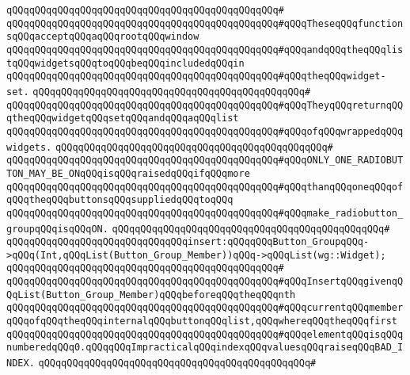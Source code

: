\verb|qQQqqQQqqQQqqQQqqQQqqQQqqQQqqQQqqQQqqQQqqQQqqQQq#|\newline
\verb|qQQqqQQqqQQqqQQqqQQqqQQqqQQqqQQqqQQqqQQqqQQqqQQq#qQQqTheseqQQqfunctionsqQQqacceptqQQqaqQQqrootqQQqwindow|\newline
\verb|qQQqqQQqqQQqqQQqqQQqqQQqqQQqqQQqqQQqqQQqqQQqqQQq#qQQqandqQQqtheqQQqlistqQQqwidgetsqQQqtoqQQqbeqQQqincludedqQQqin|\newline
\verb|qQQqqQQqqQQqqQQqqQQqqQQqqQQqqQQqqQQqqQQqqQQqqQQq#qQQqtheqQQqwidget-set.|\newline
\verb|qQQqqQQqqQQqqQQqqQQqqQQqqQQqqQQqqQQqqQQqqQQqqQQq#|\newline
\verb|qQQqqQQqqQQqqQQqqQQqqQQqqQQqqQQqqQQqqQQqqQQqqQQq#qQQqTheyqQQqreturnqQQqtheqQQqwidgetqQQqsetqQQqandqQQqaqQQqlist|\newline
\verb|qQQqqQQqqQQqqQQqqQQqqQQqqQQqqQQqqQQqqQQqqQQqqQQq#qQQqofqQQqwrappedqQQqwidgets.|\newline
\verb|qQQqqQQqqQQqqQQqqQQqqQQqqQQqqQQqqQQqqQQqqQQqqQQq#|\newline
\verb|qQQqqQQqqQQqqQQqqQQqqQQqqQQqqQQqqQQqqQQqqQQqqQQq#qQQqONLY_ONE_RADIOBUTTON_MAY_BE_ONqQQqisqQQqraisedqQQqifqQQqmore|\newline
\verb|qQQqqQQqqQQqqQQqqQQqqQQqqQQqqQQqqQQqqQQqqQQqqQQq#qQQqthanqQQqoneqQQqofqQQqtheqQQqbuttonsqQQqsuppliedqQQqtoqQQq|\newline
\verb|qQQqqQQqqQQqqQQqqQQqqQQqqQQqqQQqqQQqqQQqqQQqqQQq#qQQqmake_radiobutton_groupqQQqisqQQqON.|\newline
\verb|qQQqqQQqqQQqqQQqqQQqqQQqqQQqqQQqqQQqqQQqqQQqqQQq#|\newline
\newline
\verb|qQQqqQQqqQQqqQQqqQQqqQQqqQQqqQQqinsert:qQQqqQQqButton_GroupqQQq->qQQq(Int,qQQqList(Button_Group_Member))qQQq->qQQqList(wg::Widget);|\newline
\verb|qQQqqQQqqQQqqQQqqQQqqQQqqQQqqQQqqQQqqQQqqQQqqQQq#|\newline
\verb|qQQqqQQqqQQqqQQqqQQqqQQqqQQqqQQqqQQqqQQqqQQqqQQq#qQQqInsertqQQqgivenqQQqList(Button_Group_Member)qQQqbeforeqQQqtheqQQqnth|\newline
\verb|qQQqqQQqqQQqqQQqqQQqqQQqqQQqqQQqqQQqqQQqqQQqqQQq#qQQqcurrentqQQqmemberqQQqofqQQqtheqQQqinternalqQQqbuttonqQQqlist,qQQqwhereqQQqtheqQQqfirst|\newline
\verb|qQQqqQQqqQQqqQQqqQQqqQQqqQQqqQQqqQQqqQQqqQQqqQQq#qQQqelementqQQqisqQQqnumberedqQQq0.qQQqqQQqImpracticalqQQqindexqQQqvaluesqQQqraiseqQQqBAD_INDEX.|\newline
\verb|qQQqqQQqqQQqqQQqqQQqqQQqqQQqqQQqqQQqqQQqqQQqqQQq#|\newline
